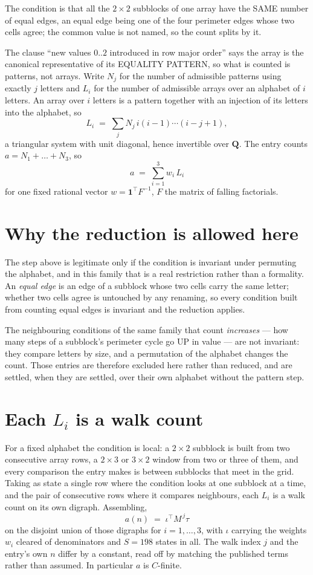 \documentclass[11pt,a4paper]{article}
\theoremstyle{plain}
\theoremstyle{definition}
\begin{document}
The condition is that all the $2\times2$ subblocks of one array have the SAME number of equal edges, an equal edge being one of the four perimeter edges whose two cells agree; the common value is not named, so the count splits by it.

The clause ``new values $0..2$ introduced in row major order'' says the array is the
canonical representative of its EQUALITY PATTERN, so what is counted is patterns, not arrays.
Write $N_j$ for the number of admissible patterns using exactly $j$ letters and $L_i$ for the
number of admissible arrays over an alphabet of $i$ letters. An array over $i$ letters is a
pattern together with an injection of its letters into the alphabet, so
\[
L_i\;=\;\sum_j N_j\,i(i-1)\cdots(i-j+1),
\]
a triangular system with unit diagonal, hence invertible over $\mathbf{Q}$. The entry counts
$a=N_1+\dots+N_{3}$, so
\[
a\;=\;\sum_{i=1}^{3}w_i\,L_i
\]
for one fixed rational vector $w=\mathbf{1}^{\!\top}F^{-1}$, $F$ the matrix of falling
factorials.

\section{Why the reduction is allowed here}

The step above is legitimate only if the condition is invariant under permuting the alphabet,
and in this family that is a real restriction rather than a formality. An \emph{equal edge}
is an edge of a subblock whose two cells carry the same letter; whether two cells agree is
untouched by any renaming, so every condition built from counting equal edges is invariant and
the reduction applies.

The neighbouring conditions of the same family that count \emph{increases} --- how many steps
of a subblock's perimeter cycle go UP in value --- are not invariant: they compare letters by
size, and a permutation of the alphabet changes the count. Those entries are therefore excluded
here rather than reduced, and are settled, when they are settled, over their own alphabet
without the pattern step.

\section{Each $L_i$ is a walk count}

For a fixed alphabet the condition is local: a $2\times2$ subblock is built from two
consecutive array rows, a $2\times3$ or $3\times2$ window from two or three of them, and every
comparison the entry makes is between subblocks that meet in the grid. Taking as state a single
row where the condition looks at one subblock at a time, and the pair of consecutive rows where
it compares neighbours, each $L_i$ is a walk count on its own digraph. Assembling,
\[
a(n)\;=\;\iota^{\!\top}M^{\,j}\tau
\]
on the disjoint union of those digraphs for $i=1,\dots,3$, with $\iota$ carrying the weights
$w_i$ cleared of denominators and $S=198$ states in all. The walk index $j$ and the entry's own
$n$ differ by a constant, read off by matching the published terms rather than assumed. In
particular $a$ is $C$-finite.
\end{document}
